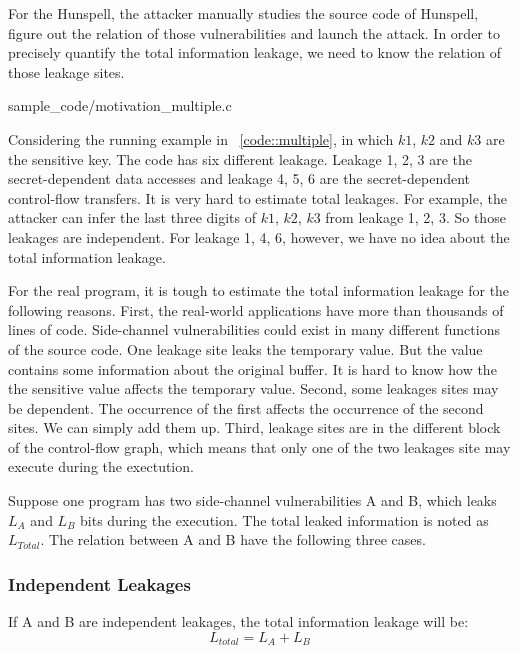 For the Hunspell, the attacker manually studies the source code of Hunspell, figure out
the relation of those vulnerabilities and launch the attack. In order to precisely quantify the
total information leakage, we need to know the relation of those leakage sites. 



                 {sample_code/motivation_multiple.c}

                

Considering the running example in ~\ref{code::multiple}, in which $k1$, $k2$ and $k3$ are
the sensitive key. The code has six different leakage. Leakage 1, 2, 3 are the secret-dependent
data accesses and leakage 4, 5, 6 are the secret-dependent control-flow transfers. It is
very hard to estimate total leakages. For example, the attacker can infer the last three digits of
$k1$, $k2$, $k3$ from leakage 1, 2, 3. So those leakages are independent. For leakage 1, 4, 6, however,
we have no idea about the total information leakage.

For the real program, it is tough to estimate the total information leakage for the following reasons.
First, the real-world applications have more than thousands of lines of code. Side-channel vulnerabilities
could exist in many different functions of the source code. One leakage site leaks the temporary value. 
But the value contains some information about the original buffer. It is hard to know how the 
the sensitive value affects the temporary value. Second, some leakages sites may be
dependent. The occurrence of the first affects the occurrence of the second sites. We 
can simply add them up. Third, leakage sites are in the different block of the 
control-flow graph, which means that only one of the two leakages site may execute
during the exectution.

Suppose one program has two side-channel vulnerabilities A and B, which leaks $L_A$ and $L_B$ bits
during the execution. The total leaked information is noted as $L_{Total}$. The relation between
A and B have the following three cases. 

\subsubsection{Independent Leakages}
If A and B are independent leakages, the total information leakage will be:
\begin{displaymath}
\label{independent leakage}
    L_{total} = L_A + L_B 
\end{displaymath} 

